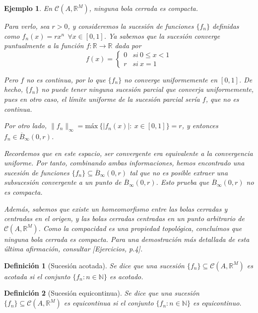 \documentclass[11pt, a4paper]{article}
\newif\IfInSansMode
\newcommand{\fn}{\{f_n\}}
\theoremstyle{theorem-style}
\theoremstyle{definition-style}
\newtheorem{ndef}{Definición}[section]
\theoremstyle{remark-style}
\theoremstyle{example-style}
\newtheorem{ejemplo}{Ejemplo}[section]
\begin{document}
\begin{ejemplo} En $\mathcal{C}(A,\mathbb{R}^M)$, ninguna bola cerrada es compacta.

  Para verlo, sea $r>0$, y consideremos la sucesión de funciones $\fn$ definidas como $f_n(x) = rx^n \ \ \forall x \in [0,1]$. Ya sabemos que la sucesión converge puntualmente a la función $f: \mathbb{R} \to \mathbb{R}$ dada por $$f(x) = \begin{cases} 0 & si\ 0 \le x < 1\\ r & si\ x = 1 \end{cases}$$

  Pero $f$ no es continua, por lo que $\fn$ no converge uniformemente en $[0,1]$. De hecho, $\fn$ no puede tener ninguna sucesión parcial que converja uniformemente, pues en otro caso, el límite uniforme de la sucesión parcial sería $f$, que no es continua.

  Por otro lado, $\|f_n\|_{\infty} = \text{máx} \ \{ |f_n(x)|:\ x \in [0,1]\} = r$, y entonces $f_n \in \overline{B}_{\infty}(0,r)$. 

  Recordemos que en este espacio, ser convergente era equivalente a la convergencia uniforme. Por tanto, combinando ambas informaciones, hemos encontrado una sucesión de funciones $\fn \subseteq \overline{B}_{\infty}(0,r)$ tal que no es posible extraer una subsucesión convergente a un punto de $\overline{B}_{\infty}(0,r)$. Esto prueba que $\overline{B}_{\infty}(0,r)$ no es compacta.

  Además, sabemos que existe un homeomorfismo entre las bolas cerradas y centradas en el origen, y las bolas cerradas centradas en un punto arbitrario de $\mathcal{C}(A,\mathbb{R}^M)$. Como la compacidad es una propiedad topológica, concluímos que ninguna bola cerrada es compacta. Para una demostración más detallada de esta última afirmación, consultar \textit{[Ejercicios, p.4]}.
\end{ejemplo}

\begin{ndef}[Sucesión acotada]
  Se dice que una sucesión $\fn \subseteq \mathcal{C}(A,\mathbb{R}^M)$ es acotada si el conjunto $\{ f_n: n \in \mathbb{N}\}$ es acotado. 
\end{ndef}

\begin{ndef}[Sucesión equicontinua]
  Se dice que una sucesión $\fn \subseteq \mathcal{C}(A,\mathbb{R}^M)$ es equicontinua si el conjunto $\{ f_n: n \in \mathbb{N}\}$ es equicontinuo. 
\end{ndef}
\end{document}
